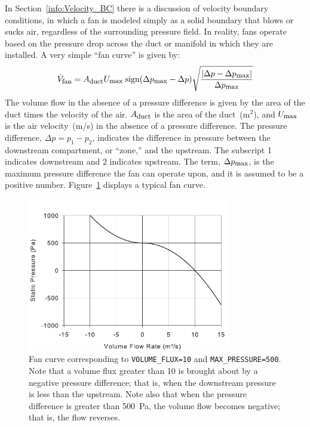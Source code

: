 \documentclass[11pt]{book}
\newcommand{\ct}{\tt\small}
\newcommand{\be}{\begin{equation}}
\newcommand{\ee}{\end{equation}}
\begin{document}
In Section~\ref{info:Velocity_BC} there is a discussion of velocity boundary conditions,
in which a fan is modeled simply as a solid boundary that blows or
sucks air, regardless of the surrounding pressure field. In reality, fans operate based on
the pressure drop across the duct or manifold in which they are
installed. A very simple ``fan curve'' is given by:
\be \dot{V}_{\hbox{\footnotesize fan}} = A_{\hbox{\footnotesize duct}} U_{\hbox{\footnotesize max}} \;
   \hbox{sign} (\Delta p_{\hbox{\footnotesize max}}-\Delta p)
   \sqrt{ \frac{ |\Delta p - \Delta p_{\hbox{\footnotesize max}}|}{\Delta p_{\hbox{\footnotesize max}} } }  \ee
The volume flow in the absence of a pressure difference is given by the area of the duct times the velocity of the air.
$A_{\hbox{\footnotesize duct}}$ is the area of the duct~(m$^2$), and $U_{\hbox{\footnotesize max}}$ is
the air velocity~(m/s) in the absence of a pressure difference. The pressure difference, $\Delta p=p_1-p_2$, indicates the difference in
pressure between the downstream compartment, or ``zone,'' and the upstream. The subscript 1 indicates downstream and 2 indicates upstream.
The term, $\Delta p_{\hbox{\footnotesize max}}$, is the maximum
pressure difference the fan can operate upon, and it is assumed to be a positive number. Figure~\ref{fig:Fan_Curve} displays a typical fan curve.

\begin{figure}[ht!]
\begin{center}
\includegraphics[width=3.5in]{FIGURES/Fan_Curve}
\caption[Example of a fan curve.]{Fan curve corresponding to {\ct VOLUME\_FLUX=10} and {\ct MAX\_PRESSURE=500}.
Note that a volume flux greater than
10 is brought about by a negative pressure difference; that is, when the downstream pressure is less than the upstream. Note also that when
the pressure difference is greater than 500~Pa, the volume flow becomes negative; that is, the flow reverses.}
\label{fig:Fan_Curve}
\end{center}
\end{figure}
\end{document}
